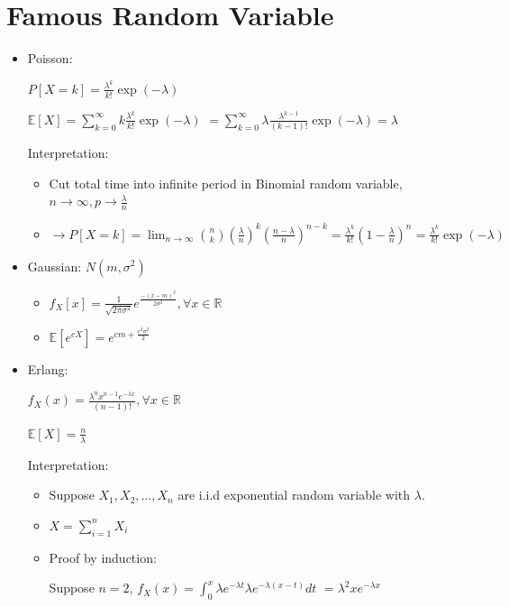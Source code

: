 \documentclass[a4paper]{article}
\begin{document}
\section{Famous Random Variable}
\begin{itemize}
    \item Poisson:

        $P[X=k] = \frac{\lambda^k}{k!}\exp(-\lambda)$

        $\mathbb{E}[X] = \sum_{k=0}^\infty k\frac{\lambda^k}{k!}\exp(-\lambda)$
        $= \sum_{k=0}^\infty \lambda \frac{\lambda^{k-1}}{(k-1)!}\exp(-\lambda) = \lambda$

        Interpretation:
        \begin{itemize}
            \item Cut total time into infinite period in Binomial random variable, $n \rightarrow \infty, p \rightarrow \frac{\lambda}{n}$

            \item $\rightarrow P[X=k] = \lim_{n\rightarrow \infty} \binom{n}{k}(\frac{\lambda}{n})^k(\frac{n-\lambda}{n})^{n-k} = \frac{\lambda^k}{k!}(1-\frac{\lambda}{n})^{n} = \frac{\lambda^k}{k!}\exp(-\lambda)$
        \end{itemize}
    \item Gaussian: $N(m, \sigma^2)$
        \begin{itemize}
            \item $f_X[x] = \frac{1}{\sqrt{2\pi\sigma^2}}e^{\frac{-(x-m)^2}{2\sigma^2}}, \forall x \in \mathbb{R}$
            \item $\mathbb{E}[e^{cX}] = e^{cm + \frac{c^2\sigma^2}{2}}$
        \end{itemize}
    \item Erlang:

        $f_X(x) = \frac{\lambda^n x^{n-1} e^{-\lambda x}}{(n-1)!}, \forall x \in \mathbb{R}$

        $\mathbb{E}[X] = \frac{n}{\lambda}$

        Interpretation:
        \begin{itemize}
            \item Suppose $X_1, X_2, ..., X_n$ are i.i.d exponential random variable with $\lambda$.
            \item $X = \sum_{i = 1}^n X_i$
            \item Proof by induction:

                Suppose $n = 2$, 
                $f_X(x) = \int_0^x \lambda e^{-\lambda t} \lambda e^{-\lambda(x - t)} dt$
                $= \lambda^2 x e^{-\lambda x}$
        \end{itemize}
\end{itemize}
\end{document}
